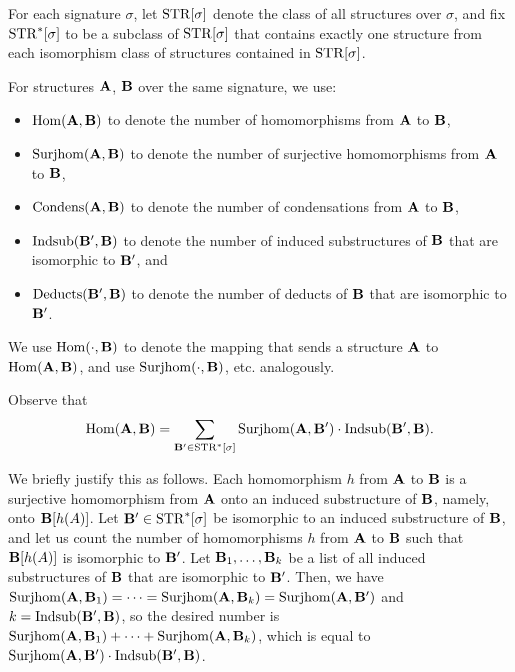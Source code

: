 \documentclass[11pt]{article}
\begin{document}
For each signature $\sigma$,
let $\mathrm{STR}[\sigma]$ denote the class of all structures over $\sigma$,
and
fix
$\mathrm{STR}^*[\sigma]$ to be a subclass of $\mathrm{STR}[\sigma]$
that contains exactly one structure from
each isomorphism class of structures contained in $\mathrm{STR}[\sigma]$.

For structures $\mathbf{A}$, $\mathbf{B}$ over the same signature,
we use:
\begin{itemize}

\item 
$\mathrm{Hom}(\mathbf{A},\mathbf{B})$ to denote the number of homomorphisms
from $\mathbf{A}$ to $\mathbf{B}$,

\item
$\mathrm{Surjhom}(\mathbf{A},\mathbf{B})$ to denote the number of surjective homomorphisms
from $\mathbf{A}$ to $\mathbf{B}$,

\item
$\mathrm{Condens}(\mathbf{A}, \mathbf{B})$ to denote the number of
condensations from $\mathbf{A}$ to $\mathbf{B}$,

\item
$\mathrm{Indsub}(\mathbf{B}', \mathbf{B})$ to denote the number of induced substructures
of $\mathbf{B}$ that are isomorphic to $\mathbf{B}'$, and

\item
$\mathrm{Deducts}(\mathbf{B}', \mathbf{B})$ to denote the number of deducts of
$\mathbf{B}$ that are isomorphic to $\mathbf{B}'$.

\end{itemize}
We use $\mathrm{Hom}(\cdot,\mathbf{B})$ to denote the mapping
that sends a structure $\mathbf{A}$ to $\mathrm{Hom}(\mathbf{A},\mathbf{B})$,
and use $\mathrm{Surjhom}(\cdot,\mathbf{B})$, etc. analogously.

Observe that
\begin{equation}
\label{eq:hom}
\mathrm{Hom}(\mathbf{A},\mathbf{B}) = \sum_{\mathbf{B}' \in \mathrm{STR}^*[\sigma]} 
\mathrm{Surjhom}(\mathbf{A},\mathbf{B}') \cdot \mathrm{Indsub}(\mathbf{B}',\mathbf{B}).
\end{equation}

We briefly justify this as follows.  Each homomorphism
$h$ from $\mathbf{A}$ to $\mathbf{B}$ is a surjective homomorphism
from $\mathbf{A}$ onto an induced substructure of $\mathbf{B}$, namely,
onto $\mathbf{B}[h(A)]$.  
Let $\mathbf{B}' \in \mathrm{STR}^*[\sigma]$ be 
isomorphic to an induced substructure of $\mathbf{B}$, and let us count
the number of homomorphisms $h$ from $\mathbf{A}$ to $\mathbf{B}$ such that
$\mathbf{B}[h(A)]$ is isomorphic to $\mathbf{B}'$.
Let $\mathbf{B}_1, \ldots, \mathbf{B}_k$ be a list of all induced substructures
of $\mathbf{B}$ that are isomorphic to $\mathbf{B}'$.
Then, we have 
$\mathrm{Surjhom}(\mathbf{A},\mathbf{B}_1) = \cdots = \mathrm{Surjhom}(\mathbf{A},\mathbf{B}_k) = \mathrm{Surjhom}(\mathbf{A},\mathbf{B}')$
and $k = \mathrm{Indsub}(\mathbf{B}',\mathbf{B})$,
so the desired number is 
$\mathrm{Surjhom}(\mathbf{A},\mathbf{B}_1) + \cdots + \mathrm{Surjhom}(\mathbf{A},\mathbf{B}_k)$,
which is equal to
$\mathrm{Surjhom}(\mathbf{A},\mathbf{B}') \cdot \mathrm{Indsub}(\mathbf{B}',\mathbf{B})$.
\end{document}
